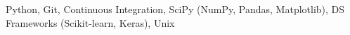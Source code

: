 \begin{cvskills}
  \cvskill
    {Python, Git, Continuous Integration, SciPy (NumPy, Pandas, Matplotlib),
    DS Frameworks (Scikit-learn, Keras), Unix}
    {} %

\end{cvskills}
